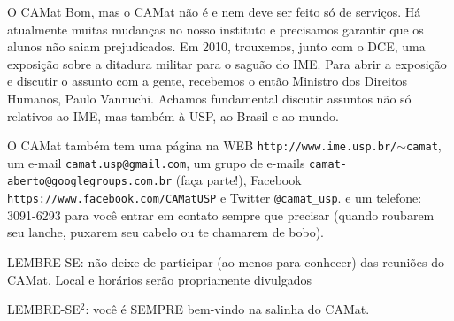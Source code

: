 \begin{secao}{O CAMat}
Bom, mas o CAMat não é e nem deve ser feito só de serviços. Há atualmente
muitas mudanças no nosso instituto e precisamos garantir que os alunos não
saiam prejudicados. Em 2010, trouxemos, junto com o
DCE, uma exposição sobre a ditadura militar para o saguão do IME. Para abrir a
exposição e discutir o assunto com a gente, recebemos o então Ministro dos
Direitos Humanos, Paulo Vannuchi. Achamos fundamental discutir assuntos não só
relativos ao IME, mas também à USP, ao Brasil e ao mundo.


O CAMat também tem uma página na WEB {\tt http://www.ime.usp.br/$\sim$camat}, um
e-mail {\tt camat.usp@gmail.com}, um grupo de e-mails {\tt camat-aberto@googlegroups.com.br} (faça parte!), Facebook {\tt https://www.facebook.com/CAMatUSP} e Twitter {\tt @camat\_usp}.
e um telefone: 3091-6293 para você entrar em contato sempre
que precisar (quando roubarem seu lanche, puxarem seu cabelo ou te chamarem de
bobo).

LEMBRE-SE: não deixe de participar (ao menos para conhecer) das reuniões do
CAMat. Local e horários serão propriamente divulgados

LEMBRE-SE$^2$: você é SEMPRE bem-vindo na salinha do CAMat.

\end{secao}
